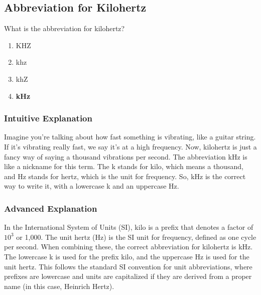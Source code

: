 \subsection{Abbreviation for Kilohertz}
\label{T5C13}

\begin{tcolorbox}[colback=gray!10!white,colframe=black!75!black,title=T5C13]
What is the abbreviation for kilohertz?
\begin{enumerate}[label=\Alph*)]
    \item KHZ
    \item khz
    \item khZ
    \item \textbf{kHz}
\end{enumerate}
\end{tcolorbox}

\subsubsection{Intuitive Explanation}
Imagine you're talking about how fast something is vibrating, like a guitar string. If it's vibrating really fast, we say it's at a high frequency. Now, kilohertz is just a fancy way of saying a thousand vibrations per second. The abbreviation kHz is like a nickname for this term. The k stands for kilo, which means a thousand, and Hz stands for hertz, which is the unit for frequency. So, kHz is the correct way to write it, with a lowercase k and an uppercase Hz.

\subsubsection{Advanced Explanation}
In the International System of Units (SI), kilo is a prefix that denotes a factor of \(10^3\) or 1,000. The unit hertz (Hz) is the SI unit for frequency, defined as one cycle per second. When combining these, the correct abbreviation for kilohertz is kHz. The lowercase k is used for the prefix kilo, and the uppercase Hz is used for the unit hertz. This follows the standard SI convention for unit abbreviations, where prefixes are lowercase and units are capitalized if they are derived from a proper name (in this case, Heinrich Hertz).

